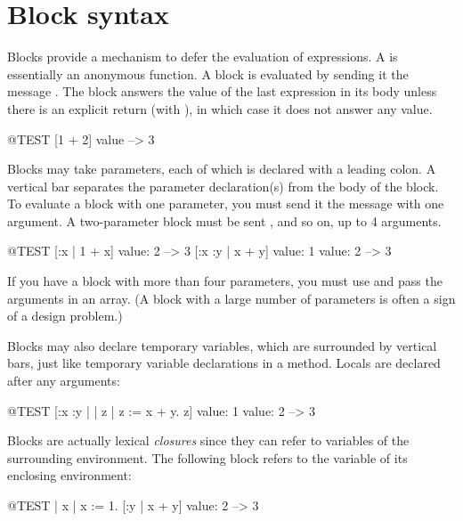 \documentclass[a4paper,10pt,twoside]{book}
\begin{document}
\section{Block syntax}

Blocks provide a mechanism to defer the evaluation of expressions.
A  is essentially an anonymous function.
A block is evaluated by sending it the message .
The block answers the value of the last expression in its body unless there is an explicit return (with \ct{^}), in which case it does not answer any value.

\begin{code}{@TEST}
[1 + 2] value --> 3
\end{code}

Blocks may take parameters, each of which is declared with a leading colon.
A  vertical bar separates the parameter declaration(s) from the body of the block.
To evaluate a block with one parameter, you must send it the message  with one argument.
A two-parameter block must be sent , and so on, up to 4 arguments.

\begin{code}{@TEST}
[:x | 1 + x] value: 2 --> 3
[:x :y | x + y] value: 1 value: 2 --> 3
\end{code}

If you have a block with more than four parameters, you must use  and pass the arguments in an array.
(A block with a large number of parameters is often a sign of a design problem.)

Blocks may also declare temporary variables, which are surrounded by vertical bars, just like temporary variable declarations in a method.
Locals are declared after any arguments:

\begin{code}{@TEST}
[:x :y | | z | z := x + y. z] value: 1 value: 2 --> 3
\end{code}

Blocks are actually lexical \emph{closures} since they can refer to variables of the surrounding environment.
The following block refers to the variable  of its enclosing environment:

\begin{code}{@TEST}
| x |
x := 1.
[:y | x + y] value: 2 --> 3
\end{code}
\end{document}

